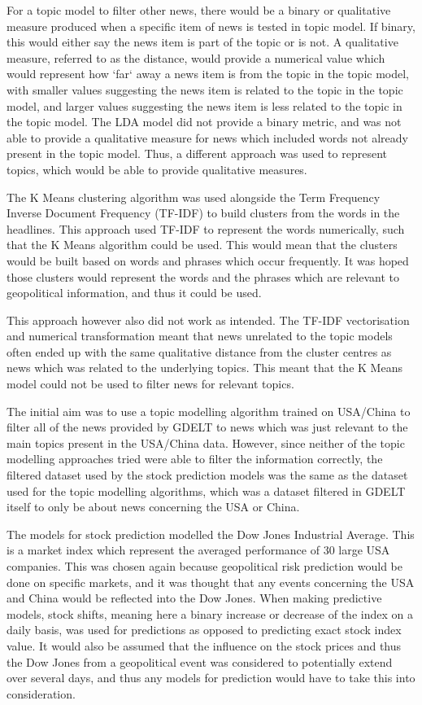 For a topic model to filter other news, there would be a binary or qualitative measure produced when a specific item of news is tested in topic model. If binary, this would either say the news item is part of the topic or is not. A qualitative measure, referred to as the distance, would provide a numerical value which would represent how `far` away a news item is from the topic in the topic model, with smaller values suggesting the news item is related to the topic in the topic model, and larger values suggesting the news item is less related to the topic in the topic model. The LDA model did not provide a binary metric, and was not able to provide a qualitative measure for news which included words not already present in the topic model. Thus, a different approach was used to represent topics, which would be able to provide qualitative measures.  

The K Means clustering algorithm was used alongside the Term Frequency Inverse Document Frequency (TF-IDF) to build clusters from the words in the headlines. This approach used TF-IDF to represent the words numerically, such that the K Means algorithm could be used. This would mean that the clusters would be built based on words and phrases which occur frequently. It was hoped those clusters would represent the words and the phrases which are relevant to geopolitical information, and thus it could be used. 

This approach however also did not work as intended. The TF-IDF vectorisation and numerical transformation meant that news unrelated to the topic models often ended up with the same qualitative distance from the cluster centres as news which was related to the underlying topics. This meant that the K Means model could not be used to filter news for relevant topics. 

The initial aim was to use a topic modelling algorithm trained on USA/China to filter all of the news provided by GDELT to news which was just relevant to the main topics present in the USA/China data. However, since neither of the topic modelling approaches tried were able to filter the information correctly, the filtered dataset used by the stock prediction models was the same as the dataset used for the topic modelling algorithms, which was a dataset filtered in GDELT itself to only be about news concerning the USA or China. 

The models for stock prediction modelled the Dow Jones Industrial Average. This is a market index which represent the averaged performance of 30 large USA companies. This was chosen again because geopolitical risk prediction would be done on specific markets, and it was thought that any events concerning the USA and China would be reflected into the Dow Jones. When making predictive models, stock shifts, meaning here a binary increase or decrease of the index on a daily basis, was used for predictions as opposed to predicting exact stock index value. It would also be assumed that the influence on the stock prices and thus the Dow Jones from a geopolitical event was considered to potentially extend over several days, and thus any models for prediction would have to take this into consideration.

